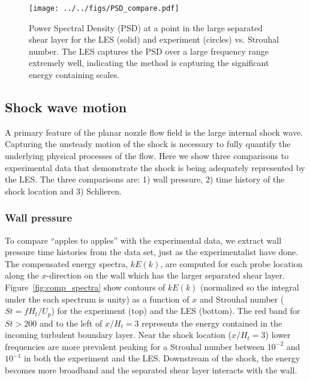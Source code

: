 \documentclass[]{aiaa-tc}%
\begin{document}
\begin{figure}
	\centering
	\texttt{[image: ../../figs/PSD\_compare.pdf]}
	\caption{ Power Spectral Density (PSD) at a point in the large separated shear layer for the LES (solid) and experiment (circles) vs. Strouhal number.  The LES captures the PSD over a large frequency range extremely well, indicating the method is capturing the significant energy containing scales.
 	\label{fig:PSD_comp}
	}
\end{figure}






\clearpage
\subsection{Shock wave motion}

A primary feature of the planar nozzle flow field is the large internal shock wave.  Capturing the unsteady motion of the shock is necessary to fully quantify the underlying physical processes of the flow.  Here we show three comparisons to experimental data that demonstrate the shock is being adequately represented by the LES.  The three comparisons are: 1) wall pressure, 2) time history of the shock location and 3) Schlieren.



\subsubsection{Wall pressure}

To compare ``apples to apples'' with the experimental data, we extract wall pressure time histories from the data set, just as the experimentalist have done.  The compensated energy spectra, $kE(k)$, are computed for each probe location along the $x$-direction on the wall which has the larger separated shear layer.  Figure~\ref{fig:comp_spectra} show contours of $kE(k)$ (normalized so the integral under the each spectrum is unity) as a function of $x$ and Strouhal number ($St=fH_t/U_p$) for the experiment (top) and the LES (bottom).  The red band for $St>200$ and to the left of $x/H_t=3$ represents the energy contained in the incoming turbulent boundary layer.  Near the shock location ($x/H_t=3$) lower frequencies are more prevalent peaking for a Strouhal number between $10^{-2}$ and $10^{-1}$ in both the experiment and the LES.  Downstream of the shock, the energy becomes more broadband and the separated shear layer interacts with the wall.  
\end{document}
